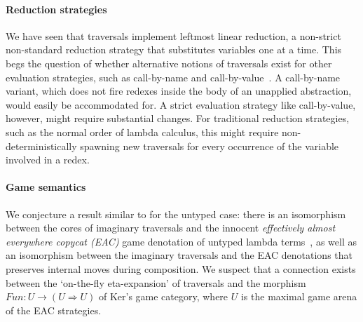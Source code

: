 \documentclass[xchauthor,chkrefs,GCNS,amsmath,amsthm,rotating,leaveRGB]{tcsg}
\theoremstyle{plain}
\theoremstyle{definition}
\begin{document}
\paragraph*{Reduction strategies}
We have seen that traversals implement leftmost linear reduction, a
non-strict non-standard reduction strategy that substitutes variables one at
a time. This begs the question of whether alternative notions of traversals
exist for other evaluation strategies, such as call-by-name and
call-by-value~\cite{plotkin-75}. A call-by-name variant, which does not fire
redexes inside the body of an unapplied abstraction, would easily be
accommodated for. A strict evaluation strategy like call-by-value, however, might require substantial changes. For traditional reduction
strategies, such as the normal order of lambda calculus, this might require
non-deterministically spawning new traversals for every occurrence of the
variable involved in a redex.

\paragraph*{Game semantics}
We conjecture a result similar to
 for the untyped case:
there is an isomorphism between the cores of imaginary traversals and the
innocent \emph{effectively almost everywhere copycat (EAC)} game denotation
of untyped lambda terms~\cite{KerThesis}, as well as an isomorphism between
the imaginary traversals and the EAC denotations that preserves internal
moves during composition. We suspect that a connection exists between the
`on-the-fly eta-expansion' of traversals and the morphism $Fun : U
\rightarrow (U \Rightarrow U)$ of Ker's game category, where $U$ is the
maximal game arena of the EAC strategies.
\end{document}
